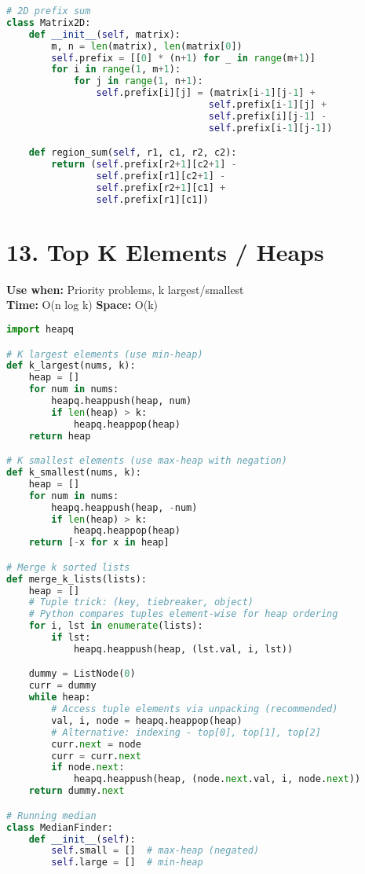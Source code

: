 \documentclass[8pt,landscape]{article}
\begin{document}
\begin{multicols}{3}
\begin{lstlisting}[language=Python]
# 2D prefix sum
class Matrix2D:
    def __init__(self, matrix):
        m, n = len(matrix), len(matrix[0])
        self.prefix = [[0] * (n+1) for _ in range(m+1)]
        for i in range(1, m+1):
            for j in range(1, n+1):
                self.prefix[i][j] = (matrix[i-1][j-1] +
                                    self.prefix[i-1][j] +
                                    self.prefix[i][j-1] -
                                    self.prefix[i-1][j-1])

    def region_sum(self, r1, c1, r2, c2):
        return (self.prefix[r2+1][c2+1] -
                self.prefix[r1][c2+1] -
                self.prefix[r2+1][c1] +
                self.prefix[r1][c1])
\end{lstlisting}

\section*{13. Top K Elements / Heaps}
\textbf{Use when:} Priority problems, k largest/smallest \\
\textbf{Time:} O(n log k) \quad \textbf{Space:} O(k)
\begin{lstlisting}[language=Python]
import heapq

# K largest elements (use min-heap)
def k_largest(nums, k):
    heap = []
    for num in nums:
        heapq.heappush(heap, num)
        if len(heap) > k:
            heapq.heappop(heap)
    return heap

# K smallest elements (use max-heap with negation)
def k_smallest(nums, k):
    heap = []
    for num in nums:
        heapq.heappush(heap, -num)
        if len(heap) > k:
            heapq.heappop(heap)
    return [-x for x in heap]

# Merge k sorted lists
def merge_k_lists(lists):
    heap = []
    # Tuple trick: (key, tiebreaker, object)
    # Python compares tuples element-wise for heap ordering
    for i, lst in enumerate(lists):
        if lst:
            heapq.heappush(heap, (lst.val, i, lst))

    dummy = ListNode(0)
    curr = dummy
    while heap:
        # Access tuple elements via unpacking (recommended)
        val, i, node = heapq.heappop(heap)
        # Alternative: indexing - top[0], top[1], top[2]
        curr.next = node
        curr = curr.next
        if node.next:
            heapq.heappush(heap, (node.next.val, i, node.next))
    return dummy.next

# Running median
class MedianFinder:
    def __init__(self):
        self.small = []  # max-heap (negated)
        self.large = []  # min-heap


\end{lstlisting}
\end{multicols}
\end{document}
